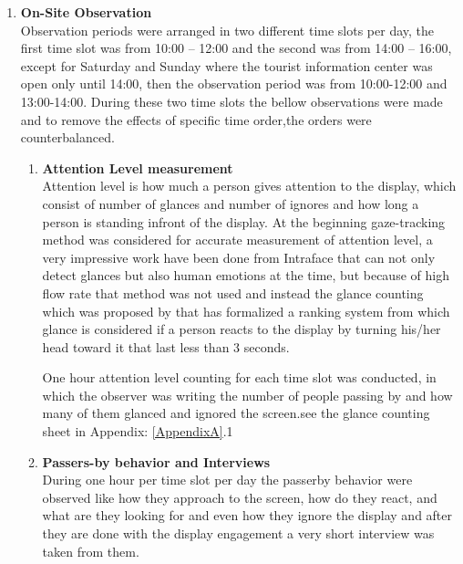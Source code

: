 \begin{enumerate}
\item \textbf{On-Site Observation} \\
Observation periods were arranged in two different time slots per day, the first time slot was from 10:00 – 12:00 and the second was from 14:00 – 16:00, except for Saturday and Sunday where the tourist information center was open only until 14:00, then the observation period was from 10:00-12:00 and 13:00-14:00. During these two time slots the bellow observations were made and to remove the effects of specific time order,the orders were counterbalanced.

\begin{enumerate}
\item \textbf{Attention Level measurement} \\
Attention level is how much a person gives attention to the display, which consist of number of glances and number of ignores and how long a person is standing infront of the display. At the beginning gaze-tracking method was considered for accurate measurement of attention level, a very impressive work have been done from Intraface \cite{Intraface} that can not only detect glances but also human emotions at the time, but because of high flow rate that method was not used and instead the glance counting which was proposed by \cite{glancingcount} that has formalized a ranking system from which  glance is considered if a person reacts to the display by turning his/her head toward it that last less than 3 seconds.

One hour attention level counting for each time slot was conducted, in which the observer was writing the number of people passing by and how many of them glanced and ignored the screen.see the glance counting sheet in Appendix: \ref{AppendixA}.1


\item \textbf{Passers-by behavior and Interviews} \\
During one hour per time slot per day the passerby behavior were observed like how they approach to the screen, how do they react, and what are they looking for and even how they ignore the display and after they are done with the display engagement a very short interview was taken from them. 


\end{enumerate}
\end{enumerate}
